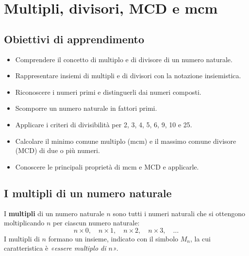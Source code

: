 
\chapter{Multipli, divisori, MCD e mcm}

\section*{Obiettivi di apprendimento}
\begin{itemize}[leftmargin=1.5em]
    \item Comprendere il concetto di multiplo e di divisore di un numero naturale.
    \item Rappresentare insiemi di multipli e di divisori con la notazione insiemistica.
    \item Riconoscere i numeri primi e distinguerli dai numeri composti.
    \item Scomporre un numero naturale in fattori primi.
    \item Applicare i criteri di divisibilità per 2, 3, 4, 5, 6, 9, 10 e 25.
    \item Calcolare il minimo comune multiplo (mcm) e il massimo comune divisore (MCD)
          di due o più numeri.
    \item Conoscere le principali proprietà di mcm e MCD e applicarle.
\end{itemize}

\section{I multipli di un numero naturale}

\begin{definizione}
    I \textbf{multipli} di un numero naturale $n$ sono tutti i numeri naturali che si
    ottengono moltiplicando $n$ per ciascun numero naturale:
    \[
        n \times 0,\quad n \times 1,\quad n \times 2,\quad n \times 3,\quad \ldots
    \]
    I multipli di $n$ formano un insieme, indicato con il simbolo $M_n$, la cui
    caratteristica è \emph{«essere multiplo di $n$»}.
\end{definizione}

